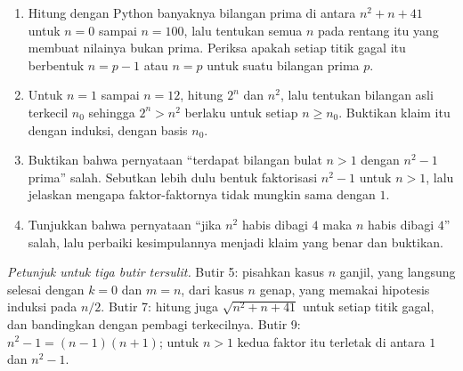 \begin{latihan}
\begin{enumerate}
  \item Hitung dengan Python banyaknya bilangan prima di antara $n^{2}+n+41$ untuk
        $n = 0$ sampai $n = 100$, lalu tentukan semua $n$ pada rentang itu yang
        membuat nilainya bukan prima. Periksa apakah setiap titik gagal itu berbentuk
        $n = p-1$ atau $n = p$ untuk suatu bilangan prima $p$.

  \item Untuk $n = 1$ sampai $n = 12$, hitung $2^{n}$ dan $n^{2}$, lalu tentukan
        bilangan asli terkecil $n_{0}$ sehingga $2^{n} > n^{2}$ berlaku untuk setiap
        $n \geq n_{0}$. Buktikan klaim itu dengan induksi, dengan basis $n_{0}$.

  \item Buktikan bahwa pernyataan ``terdapat bilangan bulat $n > 1$ dengan
        $n^{2}-1$ prima'' salah. Sebutkan lebih dulu bentuk faktorisasi $n^{2}-1$
        untuk $n > 1$, lalu jelaskan mengapa faktor-faktornya tidak mungkin sama
        dengan $1$.

  \item Tunjukkan bahwa pernyataan ``jika $n^{2}$ habis dibagi $4$ maka $n$ habis
        dibagi $4$'' salah, lalu perbaiki kesimpulannya menjadi klaim yang benar dan
        buktikan.
\end{enumerate}

\par\smallskip\noindent\textit{Petunjuk untuk tiga butir tersulit.} Butir 5: pisahkan
kasus $n$ ganjil, yang langsung selesai dengan $k=0$ dan $m=n$, dari kasus $n$ genap,
yang memakai hipotesis induksi pada $n/2$. Butir 7: hitung juga $\sqrt{n^{2}+n+41}$
untuk setiap titik gagal, dan bandingkan dengan pembagi terkecilnya. Butir 9: $n^{2}-1 = (n-1)(n+1)$; untuk $n > 1$ kedua faktor itu terletak di antara $1$
dan $n^{2}-1$.
\end{latihan}

